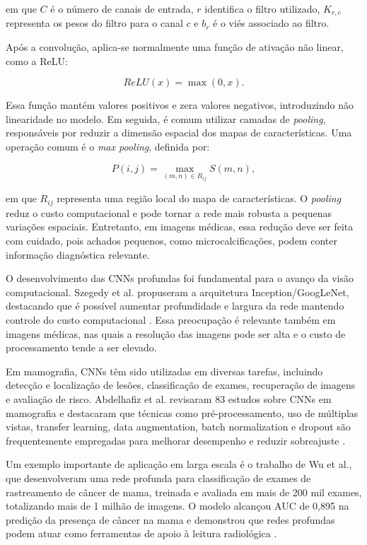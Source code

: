 \documentclass[
    12pt,
    openright,
    oneside,
    a4paper,
    english,
    brazil
]{abntex2}
\begin{document}
em que \(C\) é o número de canais de entrada, \(r\) identifica o filtro utilizado, \(K_{r,c}\) representa os pesos do filtro para o canal \(c\) e \(b_r\) é o viés associado ao filtro.

Após a convolução, aplica-se normalmente uma função de ativação não linear, como a ReLU:

\[
ReLU(x) = \max(0,x).
\]

Essa função mantém valores positivos e zera valores negativos, introduzindo não linearidade no modelo. Em seguida, é comum utilizar camadas de \textit{pooling}, responsáveis por reduzir a dimensão espacial dos mapas de características. Uma operação comum é o \textit{max pooling}, definida por:

\[
P(i,j) =
\max_{(m,n)\in R_{ij}}
S(m,n),
\]

em que \(R_{ij}\) representa uma região local do mapa de características. O \textit{pooling} reduz o custo computacional e pode tornar a rede mais robusta a pequenas variações espaciais. Entretanto, em imagens médicas, essa redução deve ser feita com cuidado, pois achados pequenos, como microcalcificações, podem conter informação diagnóstica relevante.

O desenvolvimento das CNNs profundas foi fundamental para o avanço da visão computacional. Szegedy et al. propuseram a arquitetura Inception/GoogLeNet, destacando que é possível aumentar profundidade e largura da rede mantendo controle do custo computacional \cite{szegedy2014going}. Essa preocupação é relevante também em imagens médicas, nas quais a resolução das imagens pode ser alta e o custo de processamento tende a ser elevado.

Em mamografia, CNNs têm sido utilizadas em diversas tarefas, incluindo detecção e localização de lesões, classificação de exames, recuperação de imagens e avaliação de risco. Abdelhafiz et al. revisaram 83 estudos sobre CNNs em mamografia e destacaram que técnicas como pré-processamento, uso de múltiplas vistas, transfer learning, data augmentation, batch normalization e dropout são frequentemente empregadas para melhorar desempenho e reduzir sobreajuste \cite{abdelhafiz2019}.

Um exemplo importante de aplicação em larga escala é o trabalho de Wu et al., que desenvolveram uma rede profunda para classificação de exames de rastreamento de câncer de mama, treinada e avaliada em mais de 200 mil exames, totalizando mais de 1 milhão de imagens. O modelo alcançou AUC de 0,895 na predição da presença de câncer na mama e demonstrou que redes profundas podem atuar como ferramentas de apoio à leitura radiológica \cite{wu2020deep}.
\end{document}
